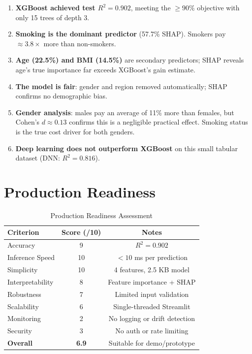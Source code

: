 \documentclass[12pt,a4paper]{report}
\begin{document}
\begin{enumerate}
  \item \textbf{XGBoost achieved test $R^2 = 0.902$}, meeting the $\geq 90\%$ objective with only 15 trees of depth 3.
  \item \textbf{Smoking is the dominant predictor} (57.7\% SHAP). Smokers pay $\approx 3.8\times$ more than non-smokers.
  \item \textbf{Age (22.5\%) and BMI (14.5\%)} are secondary predictors; SHAP reveals age's true importance far exceeds XGBoost's gain estimate.
  \item \textbf{The model is fair}: gender and region removed automatically; SHAP confirms no demographic bias.
  \item \textbf{Gender analysis}: males pay an average of 11\% more than females, but Cohen's $d \approx 0.13$ confirms this is a negligible practical effect. Smoking status is the true cost driver for both genders.
  \item \textbf{Deep learning does not outperform XGBoost} on this small tabular dataset (DNN: $R^2 = 0.816$).
\end{enumerate}

\section{Production Readiness}

\begin{table}[H]
\centering
\caption{Production Readiness Assessment}
\begin{tabular}{lcc}
\toprule
\textbf{Criterion} & \textbf{Score (/10)} & \textbf{Notes} \\
\midrule
Accuracy         & 9  & $R^2 = 0.902$ \\
Inference Speed  & 10 & $< 10$ ms per prediction \\
Simplicity       & 10 & 4 features, 2.5 KB model \\
Interpretability & 8  & Feature importance + SHAP \\
Robustness       & 7  & Limited input validation \\
Scalability      & 6  & Single-threaded Streamlit \\
Monitoring       & 2  & No logging or drift detection \\
Security         & 3  & No auth or rate limiting \\
\midrule
\textbf{Overall} & \textbf{6.9} & Suitable for demo/prototype \\
\bottomrule
\end{tabular}
\end{table}
\end{document}
